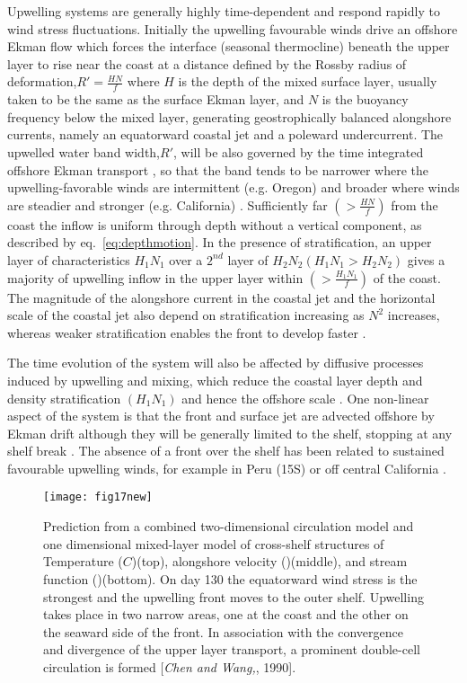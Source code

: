 Upwelling systems are generally highly time-dependent and respond
rapidly to wind stress fluctuations. Initially the upwelling
favourable winds drive an offshore Ekman flow which forces the
interface (seasonal thermocline) beneath the upper layer to rise
near the coast at a distance defined by the Rossby radius of
deformation,$R'=\frac{HN}{f}$ where $H$ is the depth of the mixed
surface layer, usually taken to be the same as the surface Ekman
layer, and $N$ is the buoyancy frequency below the mixed layer,
generating geostrophically balanced alongshore currents, namely an
equatorward coastal jet and a poleward undercurrent. The upwelled
water band width,$R'$, will be also governed by the time
integrated offshore Ekman transport , so that the band tends to be
narrower where the upwelling-favorable winds are intermittent
(e.g. Oregon) and broader where winds are steadier and stronger
(e.g. California) \citep{Szoeke84}. Sufficiently far
$(>\frac{HN}{f})$ from the coast the inflow is uniform through
depth without a vertical component, as described by
eq.~\ref{eq:depthmotion}. In the presence of stratification, an
upper layer of characteristics $H_1N_1$ over a $2^{nd}$ layer of
$H_2N_2 (H_1N_1 > H_2N_2)$ gives a majority of upwelling inflow in
the upper layer within $(>\frac{H_1N_1}{f})$ of the coast. The
magnitude of the alongshore current in the coastal jet and the
horizontal scale of the coastal jet also depend on stratification
increasing as $N^2$ increases, whereas weaker stratification
enables the front to develop faster \citep{Allen95}.

The time evolution of the system will also be affected by
diffusive processes induced by upwelling and mixing, which reduce
the coastal layer depth and density stratification  $(H_1N_1)$ and
hence the offshore scale \citep{Szoeke84}. One non-linear aspect
of the system is that the front and surface jet are advected
offshore by Ekman drift although they will be generally limited to
the shelf, stopping at any shelf break \citep{Huthnance95}. The
absence of a front over the shelf has been related to sustained
favourable upwelling winds, for example in Peru (15\deg S) or off
central California \citep{Smith81,Brink83}.
\begin{figure}
  \centering
  \texttt{[image: fig17new]}
  \caption{Prediction from a combined two-dimensional circulation
  model and one dimensional mixed-layer model of cross-shelf
  structures of Temperature ($C$)(top), alongshore velocity
  (\velc)(middle), and stream function (\mixc)(bottom). On day 130
  the equatorward wind stress is the strongest and the upwelling
  front moves to the outer shelf. Upwelling takes place in two
  narrow areas, one at the coast and the other on the seaward side
  of the front. In association with the convergence and divergence
  of the upper layer transport, a prominent double-cell
  circulation is formed
  [{\it Chen and Wang,}, 1990].}
  \label{fig:cellcirc}
\end{figure}

